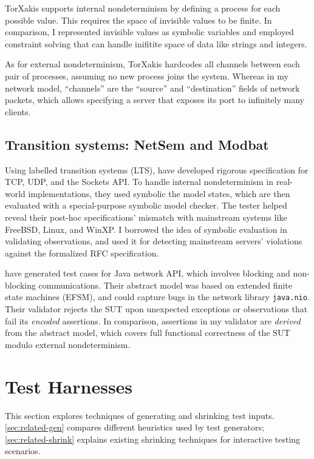 TorXakis supports internal nondeterminism by defining a process for each
possible value.  This requires the space of invisible values to be finite.  In
comparison, I represented invisible values as symbolic variables and employed
constraint solving that can handle inifitite space of data like strings and
integers.

As for external nondeterminism, TorXakis hardcodes all channels between each
pair of processes, assuming no new process joins the system.  Whereas in my
network model, ``channels'' are the ``source'' and ``destination'' fields of
network packets, which allows specifying a server that exposes its port to
infinitely many clients.

\subsection{Transition systems: NetSem and Modbat}
Using labelled transition systems (LTS), \citet{netsem} have developed rigorous
specification for TCP, UDP, and the Sockets API.  To handle internal
nondeterminism in real-world implementations, they used symbolic the model
states, which are then evaluated with a special-purpose symbolic model checker.
The tester helped reveal their post-hoc specifications' mismatch with mainstream
systems like FreeBSD, Linux, and WinXP.  I borrowed the idea of symbolic
evaluation in validating observations, and used it for detecting mainstream
servers' violations against the formalized RFC specification.

\citet{modbat} have generated test cases for Java network API, which involves
blocking and non-blocking communications.  Their abstract model was based on
extended finite state machines (EFSM), and could capture bugs in the network
library \verb|java.nio|.  Their validator rejects the SUT upon unexpected
exceptions or observations that fail its {\em encoded} assertions.  In
comparison, assertions in my validator are {\em derived} from the abstract
model, which covers full functional correctness of the SUT modulo external
nondeterminism.

\section{Test Harnesses}
\label{sec:related-harness}
This section explores techniques of generating and shrinking test inputs.
\autoref{sec:related-gen} compares different heuristics used by test generators;
\autoref{sec:related-shrink} explains existing shrinking techniques for
interactive testing scenarios.

